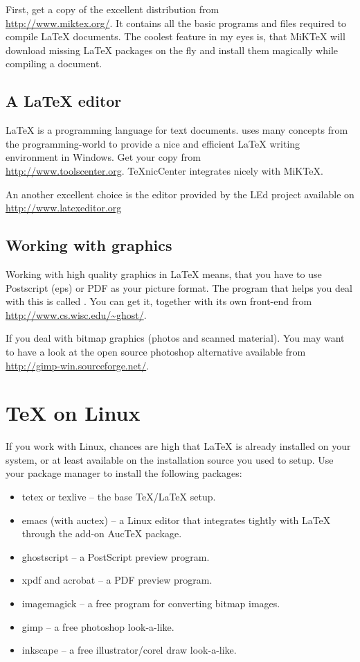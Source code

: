 First, get a copy of the excellent  distribution from\\
\url{http://www.miktex.org/}. It contains all the basic programs and files
required to compile \LaTeX{} documents.  The coolest feature in my eyes is,
that MiKTeX will download missing \LaTeX{} packages on the fly and install them
magically while compiling a document.

\subsection{A \LaTeX{} editor}

\LaTeX{} is a programming language for text documents. 
uses many concepts from the programming-world to provide a nice and
efficient \LaTeX{} writing environment in Windows. Get your copy from\\
\url{http://www.toolscenter.org}. TeXnicCenter integrates nicely with
MiKTeX.

An another excellent choice is the editor provided by the LEd project available on
\url{http://www.latexeditor.org}

\subsection{Working with graphics}

Working with high quality graphics in \LaTeX{} means, that you have to use
Postscript (eps) or PDF as your picture format. The program that helps you
deal with this is called . You can get it, together with its
own front-end  from \url{http://www.cs.wisc.edu/~ghost/}.

If you deal with bitmap graphics (photos and scanned material). You may want
to have a look at the open source photoshop alternative  available
from \url{http://gimp-win.sourceforge.net/}.

\section{\TeX{} on Linux}

If you work with Linux, chances are high that \LaTeX{} is already installed
on your system, or at least available on the installation source you used to
setup. Use your package manager to install the following packages:

\begin{itemize}
\item tetex or texlive -- the base \TeX{}/\LaTeX{} setup.
\item emacs (with auctex) -- a Linux editor that integrates tightly with \LaTeX{} through the add-on AucTeX package.
\item ghostscript -- a PostScript preview program.
\item xpdf and acrobat -- a PDF preview program.
\item imagemagick -- a free program for converting bitmap images.
\item gimp -- a free photoshop look-a-like.
\item inkscape -- a free illustrator/corel draw look-a-like.
\end{itemize}

